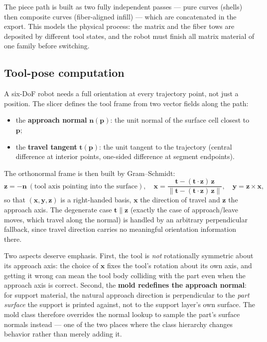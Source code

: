 The piece path is built as two fully independent passes --- pure
curves (shells) then composite curves (fiber-aligned infill) --- which
are concatenated in the export. This models the physical process:
the matrix and the fiber tows are deposited by different tool states,
and the robot must finish all matrix material of one family before
switching.

\subsection{Tool-pose computation}\label{sec:meth-frames}

A six-DoF robot needs a full orientation at every trajectory point,
not just a position. The slicer defines the tool frame from two
vector fields along the path:

\begin{itemize}
  \item the \textbf{approach normal} $\mathbf{n}(\mathbf{p})$: the unit
        normal of the surface cell closest to $\mathbf{p}$;
  \item the \textbf{travel tangent} $\mathbf{t}(\mathbf{p})$: the unit
        tangent to the trajectory (central difference at interior
        points, one-sided difference at segment endpoints).
\end{itemize}

The orthonormal frame is then built by Gram--Schmidt:
\begin{equation}
  \mathbf{z} = -\mathbf{n} \ (\text{tool axis pointing into the surface}),
  \quad
  \mathbf{x} = \frac{\mathbf{t} - (\mathbf{t}\cdot\mathbf{z})\,\mathbf{z}}
                     {\|\mathbf{t} - (\mathbf{t}\cdot\mathbf{z})\,\mathbf{z}\|},
  \quad
  \mathbf{y} = \mathbf{z} \times \mathbf{x},
\end{equation}
so that $(\mathbf{x}, \mathbf{y}, \mathbf{z})$ is a right-handed basis,
$\mathbf{x}$ the direction of travel and $\mathbf{z}$ the approach
axis. The degenerate case $\mathbf{t} \parallel \mathbf{z}$ (exactly
the case of approach/leave moves, which travel along the normal) is
handled by an arbitrary perpendicular fallback, since travel
direction carries no meaningful orientation information there.

Two aspects deserve emphasis. First, the tool is \emph{not}
rotationally symmetric about its approach axis: the choice of
$\mathbf{x}$ fixes the tool's rotation about its own axis, and getting
it wrong can mean the tool body colliding with the part even when the
approach axis is correct. Second, the \textbf{mold redefines the
approach normal}: for support material, the natural approach direction
is perpendicular to the \emph{part surface} the support is printed
against, not to the support layer's own surface. The mold class
therefore overrides the normal lookup to sample the part's surface
normals instead --- one of the two places where the class hierarchy
changes behavior rather than merely adding it.

